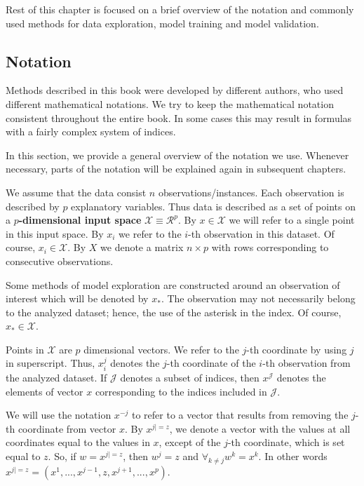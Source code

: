 \documentclass[12pt,]{krantz}
\begin{document}
Rest of this chapter is focused on a brief overview of the notation and commonly used methods for data exploration, model training and model validation.

\hypertarget{notation}{%
\subsection{Notation}\label{notation}}

Methods described in this book were developed by different authors, who used different mathematical notations.
We try to keep the mathematical notation consistent throughout the entire book. In some cases this may result in formulas with a fairly complex system of indices.

In this section, we provide a general overview of the notation we use. Whenever necessary, parts of the notation will be explained again in subsequent chapters.

We assume that the data consist \(n\) observations/instances. Each observation is described by \(p\) explanatory variables. Thus data is described as a set of points on a \textbf{\(p\)-dimensional input space} \(\mathcal X \equiv \mathcal R^p\). By \(x \in \mathcal X\) we will refer to a single point in this input space.
By \(x_i\) we refer to the \(i\)-th observation in this dataset. Of course, \(x_i \in \mathcal X\). By \(X\) we denote a matrix \(n\times p\) with rows corresponding to consecutive observations.

Some methods of model exploration are constructed around an observation of interest which will be denoted by \(x_{*}\). The observation may not necessarily belong to the analyzed dataset; hence, the use of the asterisk in the index. Of course, \(x_* \in \mathcal X\).

Points in \(\mathcal X\) are \(p\) dimensional vectors. We refer to the \(j\)-th coordinate by using \(j\) in superscript. Thus, \(x^j_i\) denotes the \(j\)-th coordinate of the \(i\)-th observation from the analyzed dataset. If \(\mathcal J\) denotes a subset of indices, then \(x^{\mathcal J}\) denotes the elements of vector \(x\) corresponding to the indices included in \(\mathcal J\).

We will use the notation \(x^{-j}\) to refer to a vector that results from removing the \(j\)-th coordinate from vector \(x\). By \textbf{\(x^{j|=z}\)}, we denote a vector with the values at all coordinates equal to the values in \(x\), except of the \(j\)-th coordinate, which is set equal to \(z\). So, if \(w=x^{j|=z}\), then \(w^j = z\) and \(\forall_{k\neq j} w^k = x^k\). In other words \(x^{j|=z} = (x^1, ..., x^{j-1}, z, x^{j+1}, ..., x^p)\).
\end{document}
